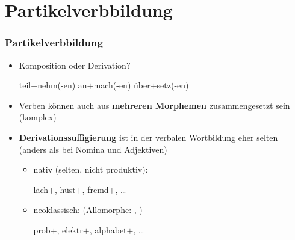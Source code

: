 \section{Partikelverbbildung}

\begin{frame}
\frametitle{Partikelverbbildung}

\begin{itemize}
\item Komposition oder Derivation?

\ea 
\ea teil$+$nehm(-en)
\ex an$+$mach(-en)
\ex über$+$setz(-en) 
\z 
\z 
\pause 

\item Verben können auch aus \textbf{mehreren Morphemen} zusammengesetzt sein (komplex)

\item \textbf{Derivationssuffigierung} ist in der verbalen Wortbildung eher selten\\
(anders als bei Nomina und Adjektiven)

\begin{itemize}
\item nativ (selten, nicht produktiv): 

\ea läch$+$, hüst$+$, fremd$+$, \dots
\z

\item neoklassisch:  (Allomorphe: , )

\ea prob$+$, elektr$+$, alphabet$+$, \dots 
\z
\end{itemize}
\end{itemize}

\end{frame}


